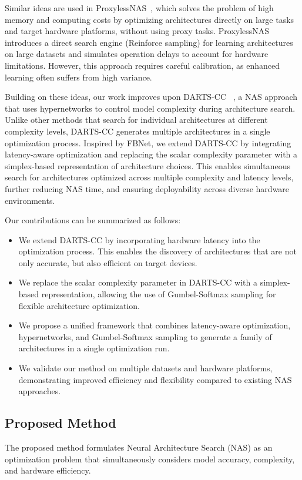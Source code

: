 \documentclass{article}
\begin{document}
Similar ideas are used in ProxylessNAS~\cite{proxylessnas}, which solves the problem of high memory and computing costs by optimizing architectures directly on large tasks and target hardware platforms, without using proxy tasks. ProxylessNAS introduces a direct search engine (Reinforce sampling) for learning architectures on large datasets and simulates operation delays to account for hardware limitations. However, this approach requires careful calibration, as enhanced learning often suffers from high variance.

Building on these ideas, our work improves upon DARTS-CC~\cite{yakovlev2021neural} %
, a NAS approach that uses hypernetworks to control model complexity during architecture search. Unlike other methods that search for individual architectures at different complexity levels, DARTS-CC generates multiple architectures in a single optimization process. Inspired by FBNet, we extend DARTS-CC by integrating latency-aware optimization and replacing the scalar complexity parameter with a simplex-based representation of architecture choices. This enables simultaneous search for architectures optimized across multiple complexity and latency levels, further reducing NAS time, and ensuring deployability across diverse hardware environments.

Our contributions can be summarized as follows:
\begin{itemize}
    \item We extend DARTS-CC by incorporating hardware latency into the optimization process. This enables the discovery of architectures that are not only accurate, but also efficient on target devices.
    \item We replace the scalar complexity parameter in DARTS-CC with a simplex-based representation, allowing the use of Gumbel-Softmax sampling for flexible architecture optimization.
    \item We propose a unified framework that combines latency-aware optimization, hypernetworks, and Gumbel-Softmax sampling to generate a family of architectures in a single optimization run.
    \item We validate our method on multiple datasets and hardware platforms, demonstrating improved efficiency and flexibility compared to existing NAS approaches.
\end{itemize}

\subsection{Proposed Method}
The proposed method formulates Neural Architecture Search (NAS) as an optimization problem that simultaneously considers model accuracy, complexity, and hardware efficiency.
\end{document}
